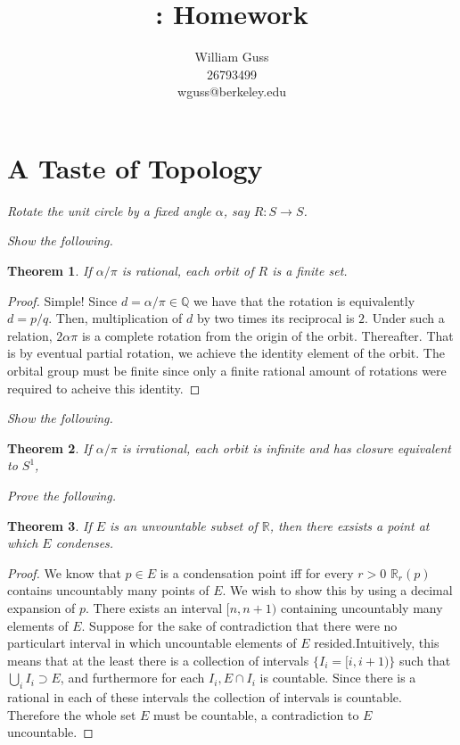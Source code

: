 \documentclass[letter]{article}
\title{\bCLASS: Homework \bHWN}
\author{William Guss\\26793499\\wguss@berkeley.edu}
\newtheorem{theorem}{Theorem}
\newenvironment{menumerate}{%
  \edef\backupindent{\the\parindent}%
  \enumerate%
  \setlength{\parindent}{\backupindent}%
}{\endenumerate}
\begin{document}
\maketitle
\thispagestyle{empty}


\setcounter{section}{1}
\section{A Taste of Topology}
\begin{menumerate}
	\setcounter{enumi}{114} %
	\item \emph{Rotate the unit circle by a fixed angle $\alpha$, say $R: S \to S$.}
		\begin{menumerate}
			\item \emph{Show the following.}
			\begin{theorem}
				If $\alpha/\pi$ is rational, each orbit of $R$ is a finite set.
			\end{theorem}
			\begin{proof}
				Simple! Since $d = \alpha/\pi \in \mathbb{Q}$ we have that the rotation is equivalently $d = p/q.$ Then, multiplication of $d$ by two times its reciprocal is $2.$ Under such a relation, $2\alpha\pi$ is a complete rotation from the origin of the orbit. Thereafter. That is by eventual partial rotation, we achieve the identity element of the orbit. The orbital group must be finite since only a finite rational amount of rotations were required to acheive this identity.
			\end{proof}

			\item \emph{Show the following.}
			\begin{theorem}
				If $\alpha/\pi$ is irrational, each orbit is infinite and has closure equivalent to $S^1$,
			\end{theorem}
		\end{menumerate}

	\setcounter{enumi}{125}
	\item \emph{Prove the following.} 
	\begin{theorem}
		If $E$ is an unvountable subset of $\mathbb{R}$, then there exsists a point at which $E$ condenses.
	\end{theorem}
	\begin{proof}
		We know that $p\in E$ is a condensation point iff for every $r > 0$ $\mathbb{R}_r (p)$ contains uncountably many points of $E.$ We wish to show this by using a decimal expansion of $p.$ There exists an interval $[n,n+1)$ containing uncountably many elements of $E$.  Suppose for the sake of contradiction that there were no particulart interval in which uncountable elements of $E$ resided.Intuitively, this means that at the least there is a collection of intervals $\{I_i = [i, i+1)\}$ such that $\bigcup_i I_i \supset E$, and furthermore for each $I_i, E \cap I_i$ is countable. Since there is a rational in each of these intervals the collection of intervals is countable. Therefore the whole set $E$ must be countable, a contradiction to $E$ uncountable. 


\end{proof}
\end{menumerate}
\end{document}
